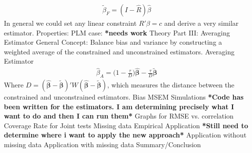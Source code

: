 \documentclass[12pt]{article}
\begin{document}
\begin{outline}[enumerate]
			\begin{align*}
				\tilde{\beta}_F = (I-\hat{R}) \hat{\beta}
			\end{align*}
			In general we could set any linear constraint $R'\beta=c$ and derive a very similar estimator.
			\3 Properties:
		\2 PLM case:
			\3 \textbf{*needs work} 
	\1 Theory Part III: Averaging Estimator
		\2 General Concept: Balance bias and variance by constructing a weighted average of the constrained and unconstrained estimators.
		\2 Averaging Estimator
			\begin{align*}
				\hat{\beta}_A = \bigg(1-\frac{\tau}{D}\bigg)\hat{\pmb{\beta}} - \frac{\tau}{D} \tilde{\pmb{\beta}}
			\end{align*}
			Where $D = (\hat{\pmb{\beta}} - \tilde{\pmb{\beta}})'W(\hat{\pmb{\beta}} - \tilde{\pmb{\beta}})$,
			which measures the distance between the constrained and unconstrained estimators.
		\2 Bias
		\2 MSEM
	\1 Simulations \textbf{*Code has been written for the estimators. I am determining precisely what I want to do and then I can run them*}
		\2 Graphs for RMSE vs. correlation
		\2 Coverage Rate for Joint tests
		\2 Missing data
	\1 Empirical Application \textbf{*Still need to determine where i want to apply the new approach*}
		\2 Application without missing data
		\2 Application with missing data
	\1 Summary/Conclusion
	
\end{outline}
\newpage
\end{document}
